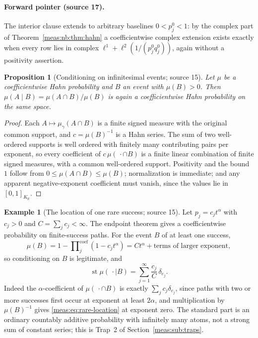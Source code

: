 \documentclass[11pt]{article}
\numberwithin{equation}{section}
\newtheorem{proposition}[theorem]{Proposition}
\theoremstyle{definition}
\newtheorem{example}[theorem]{Example}
\theoremstyle{remark}
\newcommand{\R}{\mathbb R}
\newcommand{\KR}{K_{\R}}
\newcommand{\st}{\operatorname{st}}
\newcommand{\cprod}{\mathop{\prod}\nolimits^{\mathrm{coef}}}
\begin{document}
\paragraph{Forward pointer (source 17).} The interior clause extends to arbitrary
baselines $0<p_j^0<1$: by the complex part of Theorem~\ref{meas:nb:thm:hahn} a
coefficientwise complex extension exists exactly when every row lies in complex
$\ell^1+\ell^2(1/(p_j^0q_j^0))$, again without a positivity assertion.

\begin{proposition}[Conditioning on infinitesimal events; source 15]
\label{meas:prop:conditioning}
Let $\mu$ be a coefficientwise Hahn probability and $B$ an event with $\mu(B)>0$.
Then $\mu(A\mid B)=\mu(A\cap B)/\mu(B)$ is again a coefficientwise Hahn probability
on the same space.
\end{proposition}
\begin{proof}
Each $A\mapsto\mu_\gamma(A\cap B)$ is a finite signed measure with the original common
support, and $c=\mu(B)^{-1}$ is a Hahn series. The sum of two well-ordered
supports is well ordered with finitely many contributing pairs per exponent, so
every coefficient of $c\,\mu(\,\cdot\cap B)$ is a finite linear combination of finite
signed measures, with a common well-ordered support. Positivity and the bound $1$
follow from $0\le\mu(A\cap B)\le\mu(B)$; normalization is immediate; and any apparent
negative-exponent coefficient must vanish, since the values lie in $[0,1]_{\KR}$.
\end{proof}

\begin{example}[The location of one rare success; source 15]
\label{meas:ex:conditioning}
Let $p_j=c_jt^\alpha$ with $c_j>0$ and $C=\sum_jc_j<\infty$. The endpoint theorem gives a
coefficientwise probability on finite-success paths. For the event $B$ of at least
one success,
\[
 \mu(B)=1-\cprod_j(1-c_jt^\alpha)=Ct^\alpha+\text{terms of larger exponent},
\]
so conditioning on $B$ is legitimate, and
\begin{equation}\label{meas:eq:rare-location}
 \st\mu(\,\cdot\mid B)=\sum_{j=1}^\infty\frac{c_j}C\,\delta_{e_j}.
\end{equation}
Indeed the $\alpha$-coefficient of $\mu(\,\cdot\cap B)$ is exactly $\sum_jc_j\delta_{e_j}$,
since paths with two or more successes first occur at exponent at least $2\alpha$,
and multiplication by $\mu(B)^{-1}$ gives \eqref{meas:eq:rare-location} at exponent
zero. The standard part is an ordinary countably additive probability with
infinitely many atoms, not a strong sum of constant series; this is Trap~2 of
Section~\ref{meas:sub:traps}.
\end{example}
\end{document}
